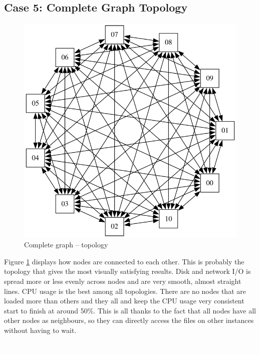 \newpage
\subsection{Case 5: Complete Graph Topology}

\begin{figure}
\centering
\captionsetup{justification=centering,width=0.8\linewidth}
\includegraphics[width=0.7\linewidth]{figures/topologies/graph-complete.png}
\caption{Complete graph -- topology}
\label{fig:graph-complete-topology}
\end{figure}

Figure \ref{fig:graph-complete-topology} displays how nodes are connected to
each other. This is probably the topology that gives the most visually
satisfying results. Disk and network I/O is spread more or less evenly across
nodes and are very smooth, almost straight lines. CPU usage is the best among
all topologies. There are no nodes that are loaded more than others and they
all and keep the CPU usage very consistent start to finish at around 50\%. This
is all thanks to the fact that all nodes have all other nodes as neighbours, so
they can directly access the files on other instances without having to wait.

\textcolor{white}{.}\\
\\
\\
\\
\\
\\

